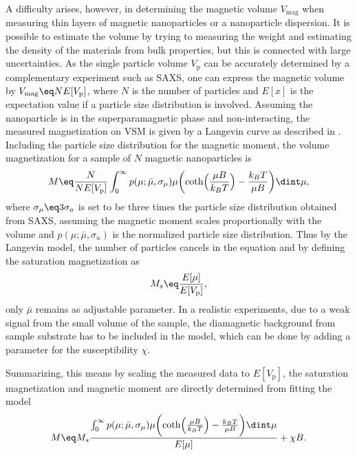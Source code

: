 \documentclass[\main/dresen_thesis.tex]{subfiles}
\begin{document}
    A difficulty arises, however, in determining the magnetic volume $V_\mathrm{mag}$ when measuring thin layers of magnetic nanoparticles or a nanoparticle dispersion.
    It is possible to estimate the volume by trying to measuring the weight and estimating the density of the materials from bulk properties, but this is connected with large uncertainties.
    As the single particle volume $V_\mathrm{p}$ can be accurately determined by a complementary experiment such as SAXS, one can express the magnetic volume by $V_\mathrm{mag} \eq N E[ V_\mathrm{p} ]$, where $N$ is the number of particles and $E[x]$ is the expectation value if a particle size distribution is involved.
    Assuming the nanoparticle is in the superparamagnetic phase and non-interacting, the measured magnetization on VSM is given by a Langevin curve as described in .
    Including the particle size distribution for the magnetic moment, the volume magnetization for a sample of $N$ magnetic nanoparticles is
    \begin{align}
      M \eq \frac{N}{N E[ V_\mathrm{p} ]}
      \int_{0}^{\infty} p(\mu; \bar{\mu}, \sigma_\mu) \mu \biggl( \coth\Bigl(\frac{\mu B}{k_B T} \Bigr) - \frac{k_B T}{\mu B} \biggr) \dint \mu,
    \end{align}
    where $\sigma_\mu \eq 3 \sigma_a$ is set to be three times the particle size distribution obtained from SAXS, assuming the magnetic moment scales proportionally with the volume and $p(\mu; \bar{\mu}, \sigma_u)$ is the normalized particle size distribution.
    Thus by the Langevin model, the number of particles cancels in the equation and by defining the saturation magnetization as
    \begin{align}
      M_s \eq \frac{E[\mu]}{E[V_\mathrm{p}]},
    \end{align}
    only $\bar{\mu}$ remains as adjustable parameter.
    In a realistic experiments, due to a weak signal from the small volume of the sample, the diamagnetic background from \ie sample substrate has to be included in the model, which can be done by adding a parameter for the susceptibility $\chi$.

    Summarizing, this means by scaling the measured data to $E[V_\mathrm{p}]$, the saturation magnetization and magnetic moment are directly determined from fitting the model
    \begin{align}
      M \eq M_s
      \frac{\int_{0}^{\infty} p(\mu; \bar{\mu}, \sigma_\mu) \mu \biggl( \coth\Bigl(\frac{\mu B}{k_B T} \Bigr) - \frac{k_B T}{\mu B} \biggr) \dint \mu}{E[\mu]} + \chi B.
    \end{align}

\end{document}
